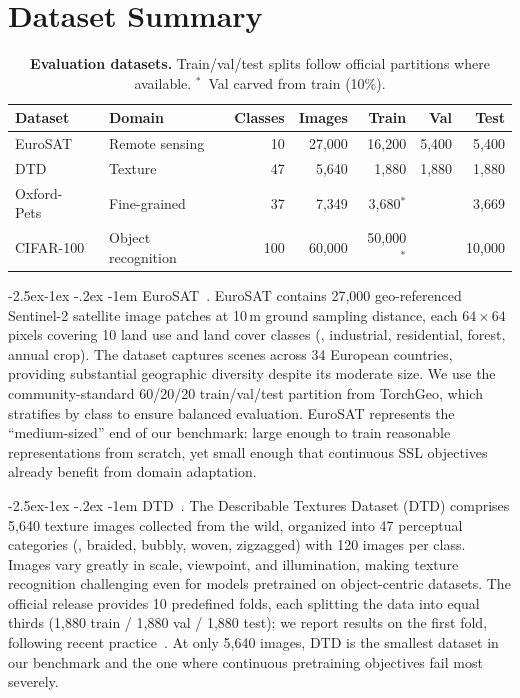 \documentclass[runningheads]{llncs}
\makeatletter
\newcommand{\tablestyle}[2]{\setlength{\tabcolsep}{#1}\renewcommand{\arraystretch}{#2}\centering\scriptsize}
\renewcommand\paragraph{\@startsection{paragraph}{4}{\z@}%
  {-2.5ex\@plus -1ex \@minus -.2ex}%
  {-1em}%
  {\normalfont\normalsize\bfseries}}
\makeatother
\begin{document}
\section{Dataset Summary}
\label{sec:app_datasets}

\begin{table}[ht]
\caption{\textbf{Evaluation datasets.}
Train/val/test splits follow official partitions where available.
$^{*}$~Val carved from train (10\%).}
\label{tab:datasets}
\tablestyle{2pt}{1.05}
\begin{tabular}{@{}llrr rrr@{}}
\toprule
Dataset & Domain & Classes & Images & Train & Val & Test \\
\midrule
EuroSAT~\cite{helber2019eurosat} & Remote sensing & 10 & 27{,}000 & 16{,}200 & 5{,}400 & 5{,}400 \\
DTD~\cite{cimpoi2014dtd} & Texture & 47 & 5{,}640 & 1{,}880 & 1{,}880 & 1{,}880 \\
Oxford-Pets~\cite{parkhi2012oxfordpets} & Fine-grained & 37 & 7{,}349 & 3{,}680$^{*}$ & & 3{,}669 \\
CIFAR-100~\cite{krizhevsky2009cifar} & Object recognition & 100 & 60{,}000 & 50{,}000$^{*}$ & & 10{,}000 \\
\bottomrule
\end{tabular}
\end{table}

\paragraph{EuroSAT~\cite{helber2019eurosat}.}
EuroSAT contains 27{,}000 geo-referenced Sentinel-2 satellite image patches at 10\,m ground sampling distance, each $64 \times 64$ pixels covering 10 land use and land cover classes (\eg, industrial, residential, forest, annual crop).
The dataset captures scenes across 34 European countries, providing substantial geographic diversity despite its moderate size.
We use the community-standard 60/20/20 train/val/test partition from TorchGeo, which stratifies by class to ensure balanced evaluation.
EuroSAT represents the ``medium-sized'' end of our benchmark: large enough to train reasonable representations from scratch, yet small enough that continuous SSL objectives already benefit from domain adaptation.

\paragraph{DTD~\cite{cimpoi2014dtd}.}
The Describable Textures Dataset (DTD) comprises 5{,}640 texture images collected from the wild, organized into 47 perceptual categories (\eg, braided, bubbly, woven, zigzagged) with 120 images per class.
Images vary greatly in scale, viewpoint, and illumination, making texture recognition challenging even for models pretrained on object-centric datasets.
The official release provides 10 predefined folds, each splitting the data into equal thirds (1{,}880 train / 1{,}880 val / 1{,}880 test); we report results on the first fold, following recent practice~\cite{grill2020bootstrap}.
At only 5{,}640 images, DTD is the smallest dataset in our benchmark and the one where continuous pretraining objectives fail most severely.
\end{document}
